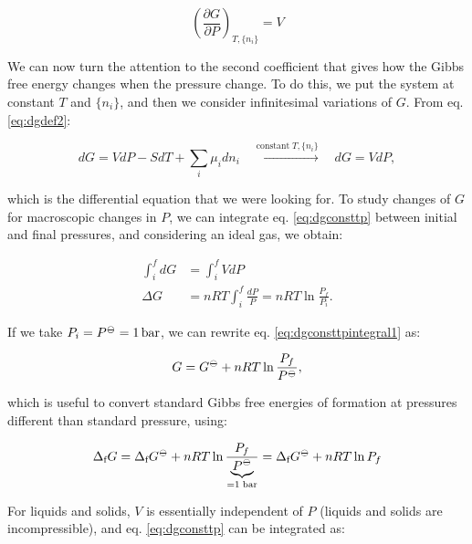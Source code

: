\documentclass[
  9pt,
]{extbook}
\theoremstyle{definition}
\theoremstyle{definition}
\theoremstyle{definition}
\theoremstyle{definition}
\theoremstyle{remark}
\begin{document}
\[
\left(\frac{\partial G}{\partial P} \right)_{T,\{n_i\}}=V
\]

We can now turn the attention to the second coefficient that gives how the Gibbs free energy changes when the pressure change. To do this, we put the system at constant \(T\) and \(\{n_i\}\), and then we consider infinitesimal variations of \(G\). From eq. \eqref{eq:dgdef2}:

\begin{equation}
dG = VdP -SdT +\sum_i\mu_i dn_i \quad \xrightarrow{\text{constant}\; T,\{n_i\}} \quad dG = VdP,
\label{eq:dgconsttp}
\end{equation}

which is the differential equation that we were looking for. To study changes of \(G\) for macroscopic changes in \(P\), we can integrate eq. \eqref{eq:dgconsttp} between initial and final pressures, and considering an ideal gas, we obtain:

\begin{equation}
\begin{aligned}
\int_i^f dG &= \int_i^f VdP \\
\Delta G &= nRT \int_i^f \frac{dP}{P} = nRT \ln \frac{P_f}{P_i}.
\end{aligned}
\label{eq:dgconsttpintegral1}
\end{equation}

If we take \(P_i = P^{-\kern-6pt{\ominus}\kern-6pt-}= 1 \, \text{bar}\), we can rewrite eq. \eqref{eq:dgconsttpintegral1} as:

\begin{equation}
G = G^{-\kern-6pt{\ominus}\kern-6pt-}+ nRT \ln \frac{P_f}{P^{-\kern-6pt{\ominus}\kern-6pt-}},
\label{eq:dgconsttpintegral2}
\end{equation}

which is useful to convert standard Gibbs free energies of formation at pressures different than standard pressure, using:

\begin{equation}
\Delta_{\text{f}} G = \Delta_{\text{f}} G^{-\kern-6pt{\ominus}\kern-6pt-}+ nRT \ln \frac{P_f}{\underbrace{P^{-\kern-6pt{\ominus}\kern-6pt-}}_{=1 \; \text{bar}}} = \Delta_{\text{f}} G^{-\kern-6pt{\ominus}\kern-6pt-}+ nRT \ln P_f
\label{eq:dgconsttpintegral2b}
\end{equation}

For liquids and solids, \(V\) is essentially independent of \(P\) (liquids and solids are incompressible), and eq. \eqref{eq:dgconsttp} can be integrated as:
\end{document}
